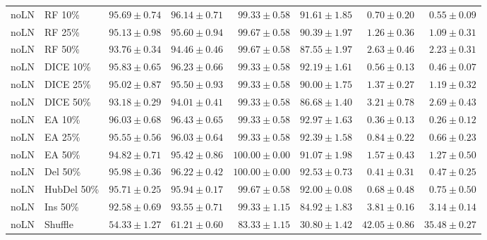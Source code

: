 {\begin{longtable}{llrrrrrr}
noLN & RF 10\% & $95.69\pm0.74$ & $96.14\pm0.71$ & $99.33\pm0.58$ & $91.61\pm1.85$ & $0.70\pm0.20$ & $0.55\pm0.09$ \\
noLN & RF 25\% & $95.13\pm0.98$ & $95.60\pm0.94$ & $99.67\pm0.58$ & $90.39\pm1.97$ & $1.26\pm0.36$ & $1.09\pm0.31$ \\
noLN & RF 50\% & $93.76\pm0.34$ & $94.46\pm0.46$ & $99.67\pm0.58$ & $87.55\pm1.97$ & $2.63\pm0.46$ & $2.23\pm0.31$ \\
noLN & DICE 10\% & $95.83\pm0.65$ & $96.23\pm0.66$ & $99.33\pm0.58$ & $92.19\pm1.61$ & $0.56\pm0.13$ & $0.46\pm0.07$ \\
noLN & DICE 25\% & $95.02\pm0.87$ & $95.50\pm0.93$ & $99.33\pm0.58$ & $90.00\pm1.75$ & $1.37\pm0.27$ & $1.19\pm0.32$ \\
noLN & DICE 50\% & $93.18\pm0.29$ & $94.01\pm0.41$ & $99.33\pm0.58$ & $86.68\pm1.40$ & $3.21\pm0.78$ & $2.69\pm0.43$ \\
noLN & EA 10\% & $96.03\pm0.68$ & $96.43\pm0.65$ & $99.33\pm0.58$ & $92.97\pm1.63$ & $0.36\pm0.13$ & $0.26\pm0.12$ \\
noLN & EA 25\% & $95.55\pm0.56$ & $96.03\pm0.64$ & $99.33\pm0.58$ & $92.39\pm1.58$ & $0.84\pm0.22$ & $0.66\pm0.23$ \\
noLN & EA 50\% & $94.82\pm0.71$ & $95.42\pm0.86$ & $100.00\pm0.00$ & $91.07\pm1.98$ & $1.57\pm0.43$ & $1.27\pm0.50$ \\
noLN & Del 50\% & $95.98\pm0.36$ & $96.22\pm0.42$ & $100.00\pm0.00$ & $92.53\pm0.73$ & $0.41\pm0.31$ & $0.47\pm0.25$ \\
noLN & HubDel 50\% & $95.71\pm0.25$ & $95.94\pm0.17$ & $99.67\pm0.58$ & $92.00\pm0.08$ & $0.68\pm0.48$ & $0.75\pm0.50$ \\
noLN & Ins 50\% & $92.58\pm0.69$ & $93.55\pm0.71$ & $99.33\pm1.15$ & $84.92\pm1.83$ & $3.81\pm0.16$ & $3.14\pm0.14$ \\
noLN & Shuffle & $54.33\pm1.27$ & $61.21\pm0.60$ & $83.33\pm1.15$ & $30.80\pm1.42$ & $42.05\pm0.86$ & $35.48\pm0.27$ \\
\end{longtable}
}
